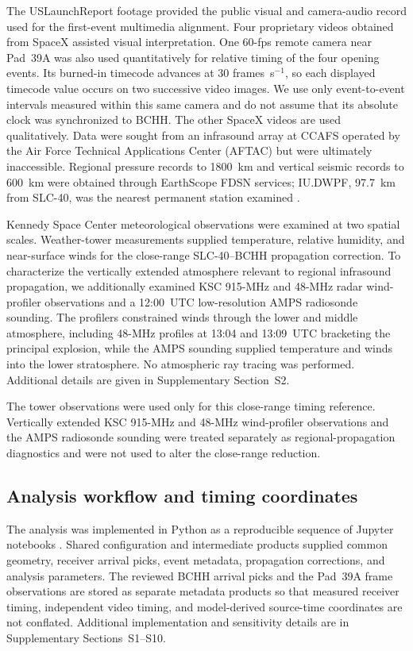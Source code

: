 \documentclass[]{seismica}
\begin{document}
The USLaunchReport footage \citep{uslaunchreport_amos6_video_2016} provided the public visual and camera-audio record used for the first-event multimedia alignment. Four proprietary videos obtained from SpaceX assisted visual interpretation. One 60-fps remote camera near Pad~39A was also used quantitatively for relative timing of the four opening events. Its burned-in timecode advances at 30 frames~s$^{-1}$, so each displayed timecode value occurs on two successive video images. We use only event-to-event intervals measured within this same camera and do not assume that its absolute clock was synchronized to BCHH. The other SpaceX videos are used qualitatively. Data were sought from an infrasound array at CCAFS operated by the Air Force Technical Applications Center (AFTAC) but were ultimately inaccessible. Regional pressure records to 1800~km
and vertical seismic records to 600~km were obtained through EarthScope FDSN
services; IU.DWPF, 97.7~km from SLC-40, was the nearest permanent station
examined \citep{asl_gsn_iu_1988}.

Kennedy Space Center meteorological observations were examined at two spatial scales. Weather-tower measurements supplied temperature, relative humidity, and near-surface winds for the close-range SLC-40--BCHH propagation correction. To characterize the vertically extended atmosphere relevant to regional infrasound propagation, we additionally examined KSC 915-MHz and 48-MHz radar wind-profiler observations and a 12:00~UTC low-resolution AMPS radiosonde sounding. The profilers constrained winds through the lower and middle atmosphere, including 48-MHz profiles at 13:04 and 13:09~UTC bracketing the principal explosion, while the AMPS sounding supplied temperature and winds into the lower stratosphere. No atmospheric ray tracing was performed. Additional details are given in Supplementary Section~S2.

The tower observations were used only for this close-range timing reference.
Vertically extended KSC 915-MHz and 48-MHz wind-profiler observations and the
AMPS radiosonde sounding were treated separately as regional-propagation
diagnostics and were not used to alter the close-range reduction.

\subsection{Analysis workflow and timing coordinates}

The analysis was implemented in Python as a reproducible sequence of Jupyter
notebooks \citep{kluyver2016jupyter}. Shared configuration and intermediate
products supplied common geometry, receiver arrival picks, event metadata,
propagation corrections, and analysis parameters. The reviewed BCHH arrival
picks and the Pad~39A frame observations are stored as separate metadata
products so that measured receiver timing, independent video timing, and
model-derived source-time coordinates are not conflated. Additional
implementation and sensitivity details are in Supplementary Sections~S1--S10.
\end{document}

